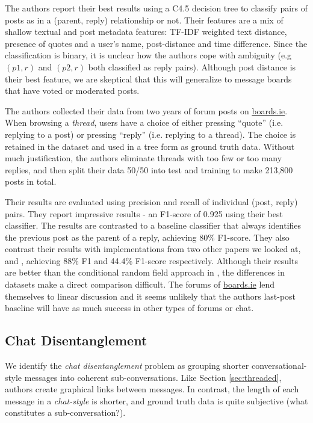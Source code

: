 \documentclass[10pt]{article}
\begin{document}
The authors report their best results using a C4.5 decision tree to classify
pairs of posts as in a (parent, reply) relationship or not. Their features are 
a mix of shallow textual and post metadata features: TF-IDF weighted text distance, 
presence of quotes and a user's name, post-distance and time difference. 
Since the classification is binary, it 
is unclear how the authors cope with ambiguity (e.g $(p1, r)$ and $(p2,r)$ both 
classified as reply pairs). Although post distance is their best feature, we are skeptical
that this will generalize to message boards that have voted or moderated posts.

The authors collected their data from two years of forum posts on
\url{boards.ie}. When browsing a \textit{thread}, users have a choice of either
pressing ``quote'' (i.e. replying to a post) or pressing ``reply'' (i.e.
replying to a thread). The choice is retained in the dataset and used in a
tree form as ground truth data. Without much justification, the authors eliminate
threads with too few or too many replies, and then split their data 50/50 into 
test and training to make 213,800 posts in total.

Their results are evaluated using precision and recall of individual
(post, reply) pairs. They report impressive results - an F1-score of 0.925 using their best
classifier. The results are contrasted to a baseline classifier that always
identifies the previous post as the parent of a reply, achieving 80\% F1-score. 
They also contrast their results with implementations from two other papers we looked at,
\cite{Elsner2008a} and \cite{Wang2008a}, achieving 88\% F1 and 44.4\% F1-score
respectively. Although their results are better than the conditional random field approach 
in \cite{Wang2011a}, the differences in datasets make a direct comparison difficult.
The forums of \url{boards.ie} lend themselves to linear discussion and it seems
unlikely that the authors last-post baseline will have as much success in 
other types of forums or chat.

\subsection{Chat Disentanglement}
\label{sec:chat}
We identify the \textit{chat disentanglement} problem as grouping
shorter conversational-style messages into coherent sub-conversations. Like 
Section \ref{sec:threaded}, authors create graphical links between messages. 
In contrast, the length of each message in a \textit{chat-style} is shorter, 
and ground truth data is quite subjective (what constitutes a sub-conversation?).
\end{document}

